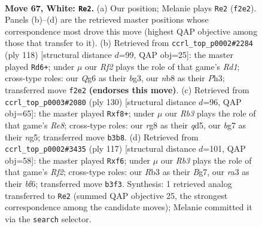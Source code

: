 \documentclass[11pt]{article}
\begin{document}
\clearpage

\begin{figure}[p]\centering
\begin{subfigure}{0.46\textwidth}\centering
\resizebox{\linewidth}{!}{%
\newchessgame
\chessboard[
  setfen={1n3kr1/6b1/6Q1/3q2P1/3P1P1p/rR5P/5R1K/8 w - - 0 67},
  showmover=false,
  pgfstyle=straightmove, color=movearrow, markmove={f2-e2}
]}
\caption{}
\end{subfigure}\hfill
\begin{subfigure}{0.46\textwidth}\centering
\resizebox{\linewidth}{!}{%
\newchessgame
\chessboard[
  setfen={7Q/1b4r1/1P4k1/q7/n4P1p/6bP/6P1/3R3K w - - 4 60},
  showmover=false,
  pgfstyle=straightmove, color=movearrow, markmove={d1-d6}
]}
\caption{}
\end{subfigure}
\\[4pt]
\begin{subfigure}{0.46\textwidth}\centering
\resizebox{\linewidth}{!}{%
\newchessgame
\chessboard[
  setfen={4Rrk1/2b3p1/8/2Pq2nQ/1P6/7P/4KP2/4R3 w - - 15 66},
  showmover=false,
  pgfstyle=straightmove, color=movearrow, markmove={e8-f8}
]}
\caption{}
\end{subfigure}\hfill
\begin{subfigure}{0.46\textwidth}\centering
\resizebox{\linewidth}{!}{%
\newchessgame
\chessboard[
  setfen={6k1/3q1rb1/p4BQ1/Pp1p3R/1P3p2/5p2/2R4K/8 b - - 0 59},
  showmover=false,
  pgfstyle=straightmove, color=movearrow, markmove={f7-f6}
]}
\caption{}
\end{subfigure}
\caption{\textbf{Move 67, White: \texttt{Re2}.} (a) Our position; Melanie plays \texttt{Re2} (\texttt{f2e2}). Panels (b)--(d) are the retrieved master positions whose correspondence most drove this move (highest QAP objective among those that transfer to it). (b) Retrieved from \texttt{ccrl\_top\_p0002\#2284} (ply 118) [structural distance $d$=99, QAP obj=25]: the master played \texttt{Rd6+}; under $\mu$ our \emph{Rf2} plays the role of that game's \emph{Rd1}; cross-type roles: our \emph{Q}g6 as their \emph{b}g3, our \emph{n}b8 as their \emph{P}h3; transferred move \texttt{f2e2} \textbf{(endorses this move)}. (c) Retrieved from \texttt{ccrl\_top\_p0003\#2080} (ply 130) [structural distance $d$=96, QAP obj=65]: the master played \texttt{Rxf8+}; under $\mu$ our \emph{Rb3} plays the role of that game's \emph{Re8}; cross-type roles: our \emph{r}g8 as their \emph{q}d5, our \emph{b}g7 as their \emph{n}g5; transferred move \texttt{b3b8}. (d) Retrieved from \texttt{ccrl\_top\_p0002\#3435} (ply 117) [structural distance $d$=101, QAP obj=58]: the master played \texttt{Rxf6}; under $\mu$ our \emph{Rb3} plays the role of that game's \emph{Rf2}; cross-type roles: our \emph{R}b3 as their \emph{B}g7, our \emph{r}a3 as their \emph{b}f6; transferred move \texttt{b3f3}. Synthesis: 1 retrieved analog transferred to \texttt{Re2} (summed QAP objective 25, the strongest correspondence among the candidate moves); Melanie committed it via the \texttt{search} selector.}
\label{fig:thought-m132}
\end{figure}
\end{document}
